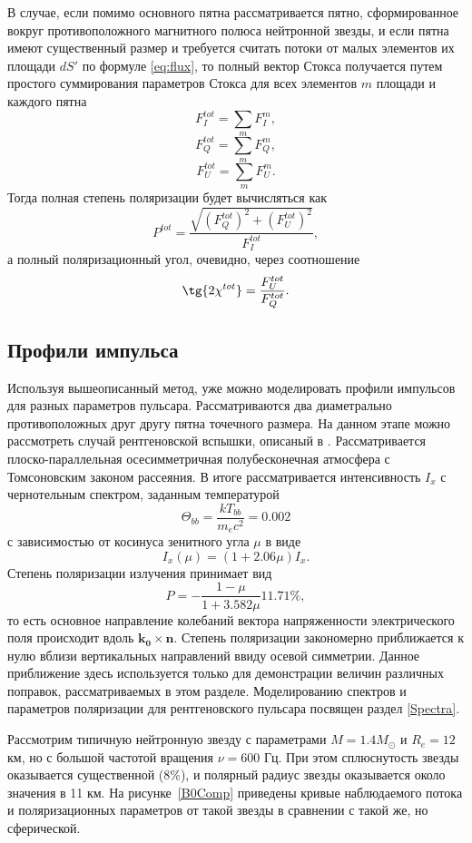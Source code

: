 \documentclass[14pt,a4paper]{extarticle}
\newcommand{\be}{\begin{equation}}
\newcommand{\ee}{\end{equation}}
\begin{document}
			В случае, если помимо основного пятна рассматривается пятно, сформированное вокруг противоположного магнитного полюса нейтронной звезды, и если пятна имеют существенный размер и требуется считать потоки от малых элементов их площади $dS'$ по формуле \eqref{eq:flux}, то полный вектор Стокса получается путем простого суммирования параметров Стокса для всех элементов $m$ площади и каждого пятна 
			$$
				F_I^{tot}=\sum_m F_I^m, $$ \be
				F_Q^{tot}=\sum_m F_Q^m,\ee $$
				F_U^{tot}=\sum_m F_U^m. $$ 
			Тогда полная степень поляризации будет вычисляться как 
			\be\label{eq:Ptot}
				P^{tot}=\frac{\sqrt{(F_Q^{tot})^2+(F_U^{tot})^2}}{F_I^{tot}}, \ee
			а полный поляризационный угол, очевидно, через соотношение 
			\be\label{eq:chitot}
				\tg{2\chi^{tot}}=\frac{F_U^{tot}}{F_Q^{tot}}.
			\ee


		\subsection{Профили импульса}\label{sub:LC}
			Используя вышеописанный метод, уже можно моделировать профили импульсов для разных параметров пульсара. 
			Рассматриваются два диаметрально противоположных друг другу пятна точечного размера.   
			На данном этапе можно рассмотреть случай рентгеновской вспышки, описаный в \cite{Viironen2004}.
			Рассматривается плоско-параллельная осесимметричная полубесконечная атмосфера с Томсоновским законом рассеяния.
			В итоге рассматривается интенсивность $I_x$ с чернотельным спектром, заданным температурой \be\label{eq:Theta}
			\Theta_{bb}=\frac{kT_{bb}}{m_ec^2}=0.002\ee
			с зависимостью от косинуса зенитного угла $\mu$ в виде
			\be
			I_x(\mu)=(1 + 2.06\mu)I_x.\ee
			Степень поляризации излучения принимает вид \be
				P=-\frac{1-\mu}{1+3.582\mu}11.71\%,
			\ee
			то есть основное направление колебаний вектора напряженности электрического поля происходит вдоль $\bm{k_0} \times \bm n$.
			Степень поляризации закономерно приближается к нулю вблизи вертикальных направлений ввиду осевой симметрии.
			Данное приближение здесь используется только для демонстрации величин различных поправок, рассматриваемых в этом разделе.
			Моделированию спектров и параметров поляризации для рентгеновского пульсара посвящен раздел \ref{Spectra}.

			Рассмотрим типичную нейтронную звезду с параметрами $M=1.4M_{\odot}$ и $R_e=12$ км, но с большой частотой вращения $\nu=600$ Гц. При этом сплюснутость звезды оказывается существенной (8\%), и полярный радиус звезды оказывается около значения в 11 км.   
			На рисунке~\ref{B0Comp} приведены кривые наблюдаемого потока и поляризационных параметров от такой звезды в сравнении с такой же, но сферической.
\end{document}
